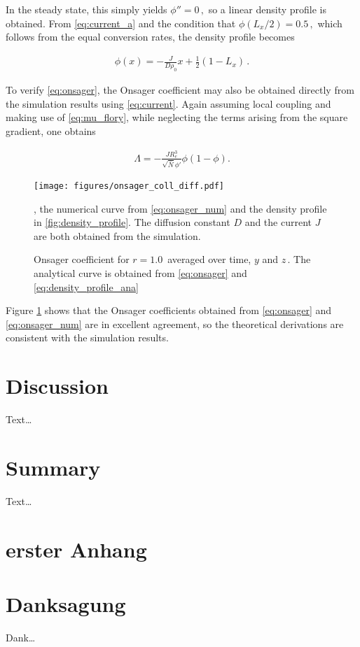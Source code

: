 \documentclass[bachelor,       %
               twoside,        %
               BCOR10mm,       %
                ngerman,english  %
               ]{GAUBM}
\begin{document}
In the steady state, this simply yields $\phi''=0\,,$ so a linear density profile is obtained. From \eqref{eq:current_a} and the condition that $\phi(L_x/2)=0.5\,,$ which follows from the equal conversion rates, the density profile becomes

\begin{align}
  \phi(x)=-\frac{J}{D\rho_0}x + \frac{1}{2} (1-L_x)\,.
  \label{eq:density_profile_ana}
\end{align}

To verify \eqref{eq:onsager}, the Onsager coefficient may also be obtained directly from the simulation results using \eqref{eq:current}. Again assuming local coupling and making use of \eqref{eq:mu_flory}, while neglecting the terms arising from the square gradient, one obtains

\begin{align}
  \Lambda=-\frac{JR_e^3}{\sqrt{\bar N}\phi'}\phi(1-\phi).
  \label{eq:onsager_num}
\end{align}

\begin{figure}[h]
  \centering
  \texttt{[image: figures/onsager\_coll\_diff.pdf]}
  \caption{Onsager coefficient for $r=1.0\,$ averaged over time, $y$ and $z\,$. The analytical curve is obtained from \eqref{eq:onsager} and \eqref{eq:density_profile_ana}}, the numerical curve from \eqref{eq:onsager_num} and the density profile in \ref{fig:density_profile}. The diffusion constant $D$ and the current $J$ are both obtained from the simulation.
  \label{fig:onsager_coeff}
\end{figure}

Figure \ref{fig:onsager_coeff} shows that the Onsager coefficients obtained from \eqref{eq:onsager} and \eqref{eq:onsager_num} are in excellent agreement, so the theoretical derivations are consistent with the simulation results.




\chapter{Discussion}
Text\dots
\chapter{Summary}
Text\dots

\appendix

\chapter{erster Anhang}


\cleardoublepage
 

\chapter*{Danksagung}
Dank\dots

\Declaration
\end{document}
